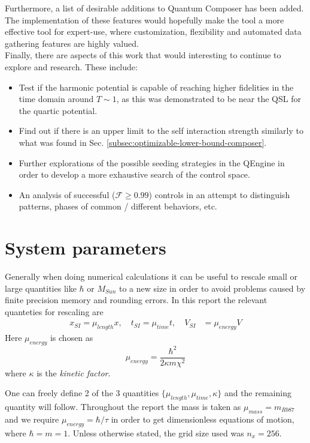 \documentclass[a4paper, twocolumn]{revtex4-1}
\begin{document}
Furthermore, a list of desirable additions to Quantum Composer has been added. The implementation of these features would hopefully make the tool a more effective tool for expert-use, where customization, flexibility and automated data gathering features are highly valued. \\

Finally, there are aspects of this work that would interesting to continue to explore and research. These include:
\begin{itemize}
	\item Test if the harmonic potential is capable of reaching higher fidelities in the time domain around $T \sim 1$, as this was demonstrated to be near the QSL for the quartic potential.
	\item Find out if there is an upper limit to the self interaction strength similarly to what was found in Sec. \ref{subsec:optimizable-lower-bound-composer}.
	\item Further explorations of the possible seeding strategies in the QEngine in order to develop a more exhaustive search of the control space.
	\item An analysis of successful ($\mathcal{F} \geq 0.99$) controls in an attempt to distinguish patterns, phases of common / different behaviors, etc.
\end{itemize}



\appendix
\section{System parameters}\label{App:System-params}
Generally when doing numerical calculations it can be useful to rescale small or large quantities like $\hbar$ or $M_{Sun}$ to a new size in order to avoid problems caused by finite precision memory and rounding errors. In this report the relevant quanteties for rescaling are
\begin{align}
	x_{SI} = \mu_{length} x, \quad t_{SI} = \mu_{time} t, \quad V_{SI} &= \mu_{energy} V
\end{align}
Here $\mu_{energy}$ is chosen as 
\begin{equation}
	\mu_{energy} = \frac{\hbar^2}{2\kappa m \chi^2}
\end{equation}
where $\kappa$ is the \textit{kinetic factor}. 

One can freely define 2 of the 3 quantities $\{ \mu_{length},\mu_{time},\kappa \}$ and the remaining quantity will follow. Throughout the report the mass is taken as $\mu_{mass}=m_{Rb87}$ and we require $\mu_{energy} = \hbar / \tau$ in order to get dimensionless equations of motion, where $\hbar = m = 1$. Unless otherwise stated, the grid size used was $n_x = 256$. \\
\end{document}

